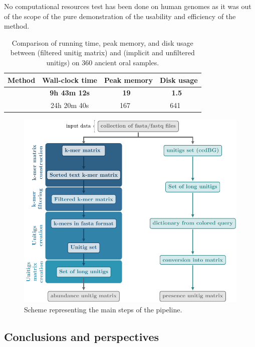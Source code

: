 No computational resources test has been done on human genomes as it was out of the scope of the pure demonstration of the usability and efficiency of the method.
\begin{table}[!t]
	\centering
	\begin{tabular}{lccc}
		\toprule
		Method & Wall-clock time & Peak memory & Disk usage \\
		\midrule
		\muset & \textbf{9h 43m 12s} & \textbf{\SI[detect-weight=true]{19}{\textbf{\giga\byte}}} & \textbf{\SI[detect-weight=true]{1.5}{\textbf{\tera\byte}}}\\
		\ggcat & 24h 20m 40s & \SI{167}{\giga\byte} & \SI{641}{\giga\byte} \\
		\bottomrule
	\end{tabular}
	\caption{Comparison of running time, peak memory, and disk usage between \muset (filtered unitig matrix) and \ggcat (implicit and unfiltered unitigs) on 360 ancient oral samples.}\label{tab:muset_comparison}
\end{table}

\begin{figure}[h!]
	\centering
	\includegraphics[width=\linewidth]{figures/kmer_methods/muset_full.pdf}
	\caption[The \muset pipeline]{Scheme representing the main steps of the \muset pipeline.}
	\label{fig:muset}
\end{figure}

\subsection{Conclusions and perspectives}
